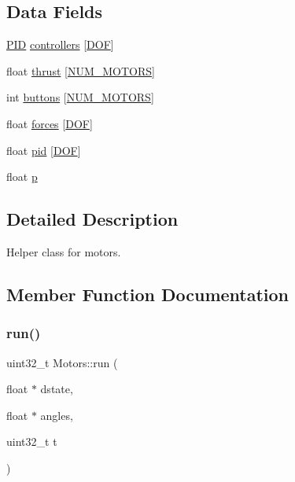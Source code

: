 \subsection*{Data Fields}
\begin{DoxyCompactItemize}
\item 
\hyperlink{structPID}{P\+ID} \hyperlink{structMotors_a7cbe4b9467412e4882ff318b9375017e}{controllers} \mbox{[}\hyperlink{config_8h_ab5c558d88abd9517fb657be4889ee1bc}{D\+OF}\mbox{]}
\item 
float \hyperlink{structMotors_ac8d20987287ffda85eed109c3bf80a12}{thrust} \mbox{[}\hyperlink{config_8h_ae84658f12c2f1b44f59af36678cf3dcc}{N\+U\+M\+\_\+\+M\+O\+T\+O\+RS}\mbox{]}
\item 
int \hyperlink{structMotors_a84b2ea1a929743410df7ead8212b767a}{buttons} \mbox{[}\hyperlink{config_8h_ae84658f12c2f1b44f59af36678cf3dcc}{N\+U\+M\+\_\+\+M\+O\+T\+O\+RS}\mbox{]}
\item 
float \hyperlink{structMotors_a17cb9b1c3fc7749984c4622439901f84}{forces} \mbox{[}\hyperlink{config_8h_ab5c558d88abd9517fb657be4889ee1bc}{D\+OF}\mbox{]}
\item 
float \hyperlink{structMotors_a94c46cb5dab8c60c9fae75cc6b7af629}{pid} \mbox{[}\hyperlink{config_8h_ab5c558d88abd9517fb657be4889ee1bc}{D\+OF}\mbox{]}
\item 
float \hyperlink{structMotors_a46e39ac60edebef57fca46f878e2c0b5}{p}
\end{DoxyCompactItemize}


\subsection{Detailed Description}
Helper class for motors. 

\subsection{Member Function Documentation}
\mbox{\label{structMotors_a0d3909ec9fadbb3028368e7340a2e707}} 
\subsubsection{\texorpdfstring{run()}{run()}}
{\footnotesize\ttfamily uint32\+\_\+t Motors\+::run (\begin{DoxyParamCaption}\item[{float $\ast$}]{dstate,  }\item[{float $\ast$}]{angles,  }\item[{uint32\+\_\+t}]{t }\end{DoxyParamCaption})}



